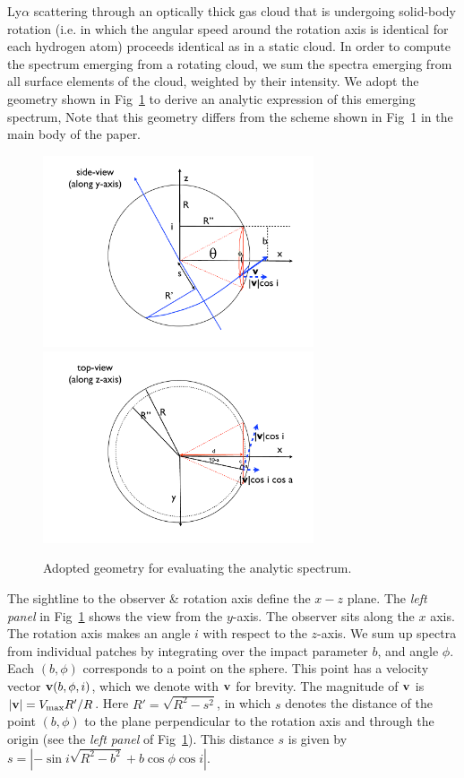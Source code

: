 Ly$\alpha$ scattering through an optically thick gas cloud that is
undergoing solid-body rotation (i.e. in which the angular speed around the
rotation axis is identical for each hydrogen atom) proceeds identical
as in a static cloud. In order to compute the spectrum emerging from a rotating cloud, we sum
the spectra emerging from all surface elements of the cloud, weighted by their intensity.
We adopt the geometry shown in Fig~\ref{fig:scheme} to derive an analytic expression of this emerging spectrum,
Note that this geometry differs from the scheme shown in Fig~1 in the main body of
the paper.
%
\begin{figure}[h]
\centerline{\includegraphics[width=80mm]{../Figures/fig11a.pdf}
\includegraphics[width=80mm]{../Figures/fig11b.pdf}}
\caption[]{Adopted geometry for evaluating the analytic spectrum.}
\label{fig:scheme}
\end{figure}
%
The sightline to the observer \& rotation axis define the $x-z$ plane.
The {\it left panel} in Fig~\ref{fig:scheme} shows the view from the $y$-axis.
The observer sits along the $x$ axis.
The rotation axis makes an angle $i$ with respect to the $z$-axis.
We sum up spectra from individual patches by integrating over the
impact parameter $b$, and angle $\phi$.
Each $(b,\phi)$ corresponds to a point on the sphere.
This point has a velocity vector ${\bf v}(b,\phi,i)$, which we denote
with ${\bf v}$ for brevity. The magnitude of ${\bf v}$ is $|{\bf v}|=V_{\rm max}R'/R$. Here $R'=\sqrt{R^2 -s^2}$, in which $s$ denotes the distance of the point $(b,\phi)$ to the plane perpendicular to the rotation axis and through the origin (see the {\it left panel} of Fig~\ref{fig:scheme}). This distance $s$ is given by $s=|-\sin i\sqrt{R^2-b^2}+ b \cos \phi \cos i|$.\\
